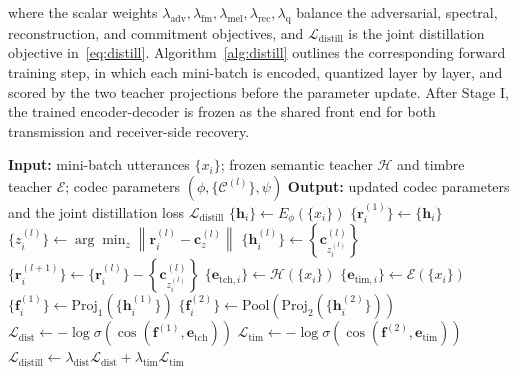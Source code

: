 \documentclass[lettersize,journal]{IEEEtran}
\begin{document}
where the scalar weights $\lambda_{\mathrm{adv}},\lambda_{\mathrm{fm}},\lambda_{\mathrm{mel}},\lambda_{\mathrm{rec}},\lambda_{\mathrm{q}}$ balance the adversarial, spectral, reconstruction, and commitment objectives, and $\mathcal{L}_{\mathrm{distill}}$ is the joint distillation objective in~\eqref{eq:distill}. Algorithm~\ref{alg:distill} outlines the corresponding forward training step, in which each mini-batch is encoded, quantized layer by layer, and scored by the two teacher projections before the parameter update.
After Stage I, the trained encoder-decoder is frozen as the shared front end for both transmission and receiver-side recovery.

\begin{algorithm}[tb]\small
\setlength{\baselineskip}{12.0pt}
\caption{Forward Training Step of the Layered Codec}
\label{alg:distill}
\begin{algorithmic}[1]
\STATE \textbf{Input:} mini-batch utterances $\{x_i\}$; frozen semantic teacher $\mathcal{H}$ and timbre teacher $\mathcal{E}$; codec parameters $(\phi,\{\mathcal{C}^{(l)}\},\psi)$
\STATE \textbf{Output:} updated codec parameters and the joint distillation loss $\mathcal{L}_{\mathrm{distill}}$
\STATE $\{\mathbf{h}_i\}\leftarrow E_{\phi}(\{x_i\})$ 
\STATE $\{\mathbf{r}^{(1)}_i\}\leftarrow\{\mathbf{h}_i\}$ 
\STATE $\{z^{(l)}_i\}\leftarrow\arg\min_{z}\left\|\mathbf{r}^{(l)}_i-\mathbf{c}^{(l)}_{z}\right\|$ 
\STATE $\{\mathbf{h}^{(l)}_i\}\leftarrow\left\{\mathbf{c}^{(l)}_{z^{(l)}_i}\right\}$ 
\STATE $\{\mathbf{r}^{(l+1)}_i\}\leftarrow\{\mathbf{r}^{(l)}_i\}-\left\{\mathbf{c}^{(l)}_{z^{(l)}_i}\right\}$
\ENDFOR
\STATE $\{\mathbf{e}_{\mathrm{tch},i}\}\leftarrow\mathcal{H}(\{x_i\})$ 
\STATE $\{\mathbf{e}_{\mathrm{tim},i}\}\leftarrow\mathcal{E}(\{x_i\})$
\STATE $\{\mathbf{f}^{(1)}_i\}\leftarrow\mathrm{Proj}_1\!\left(\{\mathbf{h}^{(1)}_i\}\right)$ 
\STATE $\{\mathbf{f}^{(2)}_i\}\leftarrow\mathrm{Pool}\!\left(\mathrm{Proj}_2\!\left(\{\mathbf{h}^{(2)}_i\}\right)\right)$ 
\STATE $\mathcal{L}_{\mathrm{dist}}\leftarrow-\log\sigma\!\left(\cos(\mathbf{f}^{(1)},\mathbf{e}_{\mathrm{tch}})\right)$ 
\STATE $\mathcal{L}_{\mathrm{tim}}\leftarrow-\log\sigma\!\left(\cos(\mathbf{f}^{(2)},\mathbf{e}_{\mathrm{tim}})\right)$ 
\STATE $\mathcal{L}_{\mathrm{distill}}\leftarrow\lambda_{\mathrm{dist}}\mathcal{L}_{\mathrm{dist}}+\lambda_{\mathrm{tim}}\mathcal{L}_{\mathrm{tim}}$ 

\end{algorithmic}
\end{algorithm}
\end{document}
